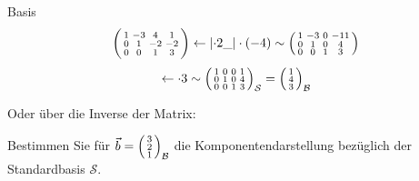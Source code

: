 \begin{example2}{Basis}
    $$
    \begin{psmallmatrix}1 & -3 & 4 & 1 \\ 0 & 1 & -2 & -2 \\ 0 & 0 & 1 & 3\end{psmallmatrix} \leftarrow\left|\cdot 2 \_\right| \cdot(-4) \sim\begin{psmallmatrix}1 & -3 & 0 & -11 \\ 0 & 1 & 0 & 4 \\ 0 & 0 & 1 & 3\end{psmallmatrix} 
    $$
    $$
    \leftarrow  \cdot 3 \sim\begin{psmallmatrix}1 & 0 & 0 & 1 \\ 0 & 1 & 0 & 4 \\ 0 & 0 & 1 & 3\end{psmallmatrix}_{\mathcal{S}}=\begin{psmallmatrix}1 \\ 4 \\ 3\end{psmallmatrix}_{\mathcal{B}}
    $$

    Oder über die Inverse der Matrix:


    \vspace{3mm}

    Bestimmen Sie für $\vec{b}=\begin{psmallmatrix}3 \\ 2 \\ 1\end{psmallmatrix}_{\mathcal{B}}$ die Komponentendarstellung bezüglich der Standardbasis $\mathcal{S}$.


\end{example2}
